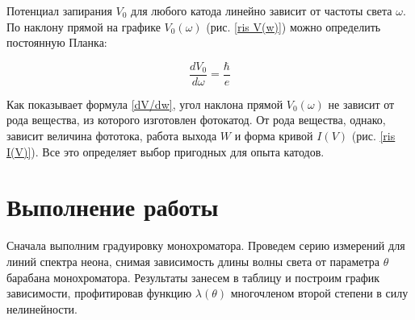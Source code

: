 \documentclass[12pt]{kiarticle} %
\begin{document}
	Потенциал запирания $ V_0 $ для любого катода линейно зависит от
	частоты света $ \omega $. По наклону прямой на графике $ V_0(\omega) $ (рис. \ref{ris V(w)}) можно определить постоянную Планка:
	
	\begin{equation}\label{dV/dw}
	\dfrac{dV_0}{d\omega} = \dfrac{\hbar}{e}
	\end{equation}
	
	Как показывает формула \eqref{dV/dw}, угол наклона прямой $ V_0(\omega) $ не зависит от рода вещества, из которого изготовлен фотокатод. От рода вещества, однако, зависит величина фототока, работа выхода $ W $ и форма кривой $ I(V) $ (рис. \ref{ris I(V)}). Все это определяет выбор пригодных для
	опыта катодов.


	
	
	\section{Выполнение работы}
	
	Сначала выполним градуировку монохроматора. Проведем серию измерений для линий спектра неона, снимая зависимость длины волны света от параметра $ \theta $ барабана монохроматора. Результаты занесем в таблицу и построим график зависимости, профитировав функцию $ \lambda (\theta) $ многочленом второй степени в силу нелинейности. 
	
\end{document}
